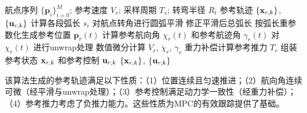 \begin{algorithm}[htbp]
\caption{参考轨迹生成}\label{alg:traj_gen}
\begin{algorithmic}[1]
\Require 航点序列 $\{\mathbf{p}_i\}_{i=0}^{M}$; 参考速度 $V_r$; 采样周期 $T_s$; 转弯半径 $R_t$
\Ensure 参考轨迹 $\{\mathbf{x}_{r,k}\}$, $\{\mathbf{u}_{r,k}\}$
\State 计算各段弧长 $s_i$ 
\State 对航点转角进行圆弧平滑 
\State 修正平滑后总弧长
\State 按弧长重参数化生成参考位置 $\mathbf{p}_r(t)$ 
\State 计算参考航向角 $\chi_r(t)$ 和参考航迹角 $\gamma_r(t)$
\State 对 $\chi_r(t)$ 进行unwrap处理 
\State 数值微分计算 $\dot{V}_r$, $\dot{\chi}_r$, $\dot{\gamma}_r$
\State 重力补偿计算参考推力 $T_r$ 
\State 组装参考状态 $\mathbf{x}_{r,k}$ 和参考控制 $\mathbf{u}_{r,k}$
\State \Return $\{\mathbf{x}_{r,k}\}$, $\{\mathbf{u}_{r,k}\}$
\end{algorithmic}
\end{algorithm}

该算法生成的参考轨迹满足以下性质：（1）位置连续且匀速推进；（2）航向角连续可微（经平滑与unwrap处理）；（3）参考控制满足动力学一致性（经重力补偿）；（4）参考推力考虑了负推力能力。这些性质为MPC的有效跟踪提供了基础。
